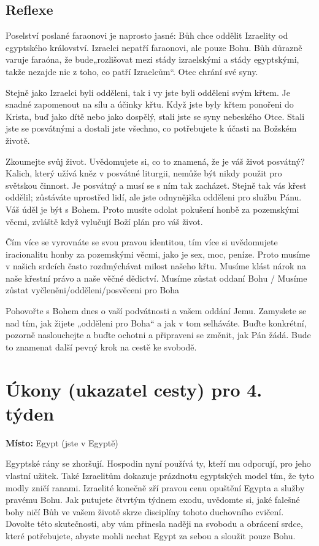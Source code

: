 \documentclass[11pt]{article}
\begin{document}
\subsection*{Reflexe}

Poselství poslané faraonovi je naprosto jasné: Bůh chce oddělit Izraelity od egyptského království. Izraelci nepatří
faraonovi, ale pouze Bohu. Bůh důrazně varuje faraóna, že bude„rozlišovat mezi stády izraelskými a stády
egyptskými, takže nezajde nic z toho, co patří Izraelcům“. Otec chrání své syny.

Stejně jako Izraelci byli odděleni, tak i vy jste byli odděleni svým křtem. Je snadné zapomenout na sílu a účinky
křtu. Když jste byly křtem ponořeni do Krista, buď jako dítě nebo jako dospělý, stali jste se syny nebeského Otce.
Stali jste se posvátnými a dostali jste všechno, co potřebujete k účasti na Božském životě.

Zkoumejte svůj život. Uvědomujete si, co to znamená, že je váš život posvátný? Kalich, který užívá kněz v
posvátné liturgii, nemůže být nikdy použit pro světskou činnost. Je posvátný a musí se s ním tak zacházet. Stejně
tak vás křest oddělil; zůstáváte uprostřed lidí, ale jste odnynějška odděleni pro službu Pánu. Váš úděl je být s
Bohem. Proto musíte odolat pokušení honbě za pozemskými věcmi, zvláště když vylučují Boží plán pro váš život.

Čím více se vyrovnáte se svou pravou identitou, tím více si uvědomujete iracionalitu honby za pozemskými věcmi,
jako je sex, moc, peníze. Proto musíme v našich srdcích často rozdmýchávat milost našeho křtu. Musíme klást
nárok na naše křestní právo a naše věčné dědictví. Musíme zůstat oddaní Bohu / Musíme zůstat
vyčleněni/odděleni/posvěceni pro Boha

Pohovořte s Bohem dnes o vaší podvátnosti a vašem oddání Jemu. Zamyslete se nad tím, jak žijete „odděleni pro
Boha“ a jak v tom selháváte. Buďte konkrétní, pozorně naslouchejte a buďte ochotni a připraveni se změnit, jak
Pán žádá. Bude to znamenat další pevný krok na cestě ke svobodě.

\newpage
\section*{Úkony (ukazatel cesty) pro 4. týden}

\textbf{Místo:} Egypt (jste v Egyptě)

Egyptské rány se zhoršují. Hospodin nyní používá ty, kteří mu odporují, pro jeho vlastní užitek. Také
Izraelitům dokazuje prázdnotu egyptských model tím, že tyto modly zničí ranami. Izraelité konečně zří
pravou cenu opuštění Egypta a služby pravému Bohu. Jak putujete čtvrtým týdnem exodu, uvědomte si,
jaké falešné bohy ničí Bůh ve vašem životě skrze disciplíny tohoto duchovního cvičení. Dovolte této
skutečnosti, aby vám přinesla naději na svobodu a obrácení srdce, které potřebujete, abyste mohli nechat
Egypt za sebou a sloužit pouze Bohu.
\end{document}
